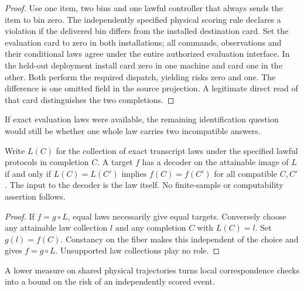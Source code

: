 \begin{proof}

Use one item, two bins and one lawful controller that always sends the item to bin zero. The independently specified physical scoring rule declares a violation if the delivered bin differs from the installed destination card. Set the evaluation card to zero in both installations; all commands, observations and their conditional laws agree under the entire authorized evaluation interface. In the held-out deployment install card zero in one machine and card one in the other. Both perform the required dispatch, yielding risks zero and one. The difference is one omitted field in the source projection. A legitimate direct read of that card distinguishes the two completions.

\end{proof}

If exact evaluation laws were available, the remaining identification question would still be whether one whole law carries two incompatible answers.

\begin{theorem}\label{thm:t17}

Write \(L(C)\) for the collection of exact transcript laws under the specified lawful protocols in completion \(C\). A target \(f\) has a decoder on the attainable image of \(L\) if and only if \(L(C)=L(C')\) implies \(f(C)=f(C')\) for all compatible \(C,C'\). The input to the decoder is the law itself. No finite-sample or computability assertion follows.

\end{theorem}

\begin{proof}

If \(f=g\circ L\), equal laws necessarily give equal targets. Conversely choose any attainable law collection \(l\) and any completion \(C\) with \(L(C)=l\). Set \(g(l)=f(C)\). Constancy on the fiber makes this independent of the choice and gives \(f=g\circ L\). Unsupported law collections play no role.

\end{proof}

A lower measure on shared physical trajectories turns local correspondence checks into a bound on the risk of an independently scored event.


